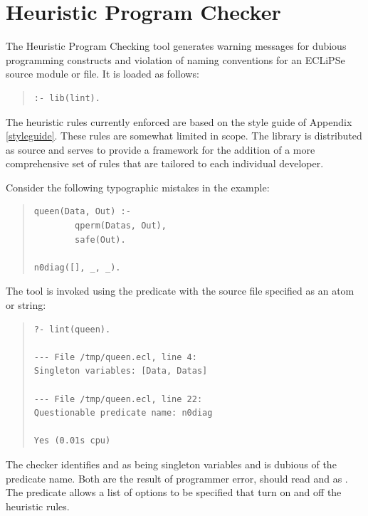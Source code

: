 \section{Heuristic Program Checker}

The Heuristic Program Checking tool generates warning messages for
dubious programming constructs and violation of naming conventions for
an ECLiPSe source module or file. It is loaded as follows:

\begin{quote}
\begin{verbatim}
:- lib(lint).
\end{verbatim}
\end{quote}

The heuristic rules currently enforced are based on the style guide of
Appendix \ref{styleguide}. These rules are somewhat limited in scope. The
library
is distributed as source and serves to provide a framework for the
addition of a more comprehensive set of rules that are tailored to each
individual developer.

Consider the following typographic mistakes in the 
example:

\begin{quote}
\begin{verbatim}
queen(Data, Out) :-
        qperm(Datas, Out),
        safe(Out).

n0diag([], _, _).
\end{verbatim}
\end{quote}

The tool is invoked using the
 predicate with the source
file specified as an atom or string:

\begin{quote}
\begin{verbatim}
?- lint(queen).

--- File /tmp/queen.ecl, line 4:
Singleton variables: [Data, Datas]

--- File /tmp/queen.ecl, line 22:
Questionable predicate name: n0diag

Yes (0.01s cpu)
\end{verbatim}
\end{quote}

The checker identifies  and  as being singleton
variables
and is dubious of the  predicate name. Both are the result of
programmer error,  should read  and
as . The 
predicate allows a list of options to be specified that turn on
and off the heuristic rules.

